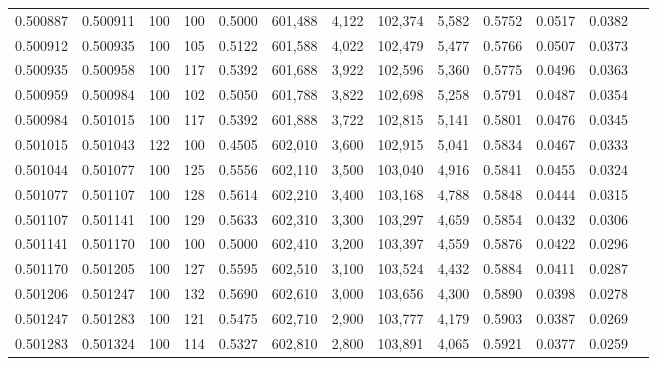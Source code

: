 \begin{tabular}{rrrrrrrrrrrrr}
0.500887 & 0.500911 &   100 & 100 &                                     0.5000 & 601,488 &   4,122 & 102,374 &   5,582 & 0.5752 & 0.0517 & 0.0382 \\
0.500912 & 0.500935 &   100 & 105 &                                     0.5122 & 601,588 &   4,022 & 102,479 &   5,477 & 0.5766 & 0.0507 & 0.0373 \\
0.500935 & 0.500958 &   100 & 117 &                                     0.5392 & 601,688 &   3,922 & 102,596 &   5,360 & 0.5775 & 0.0496 & 0.0363 \\
0.500959 & 0.500984 &   100 & 102 &                                     0.5050 & 601,788 &   3,822 & 102,698 &   5,258 & 0.5791 & 0.0487 & 0.0354 \\
0.500984 & 0.501015 &   100 & 117 &                                     0.5392 & 601,888 &   3,722 & 102,815 &   5,141 & 0.5801 & 0.0476 & 0.0345 \\
0.501015 & 0.501043 &   122 & 100 &                                     0.4505 & 602,010 &   3,600 & 102,915 &   5,041 & 0.5834 & 0.0467 & 0.0333 \\
0.501044 & 0.501077 &   100 & 125 &                                     0.5556 & 602,110 &   3,500 & 103,040 &   4,916 & 0.5841 & 0.0455 & 0.0324 \\
0.501077 & 0.501107 &   100 & 128 &                                     0.5614 & 602,210 &   3,400 & 103,168 &   4,788 & 0.5848 & 0.0444 & 0.0315 \\
0.501107 & 0.501141 &   100 & 129 &                                     0.5633 & 602,310 &   3,300 & 103,297 &   4,659 & 0.5854 & 0.0432 & 0.0306 \\
0.501141 & 0.501170 &   100 & 100 &                                     0.5000 & 602,410 &   3,200 & 103,397 &   4,559 & 0.5876 & 0.0422 & 0.0296 \\
0.501170 & 0.501205 &   100 & 127 &                                     0.5595 & 602,510 &   3,100 & 103,524 &   4,432 & 0.5884 & 0.0411 & 0.0287 \\
0.501206 & 0.501247 &   100 & 132 &                                     0.5690 & 602,610 &   3,000 & 103,656 &   4,300 & 0.5890 & 0.0398 & 0.0278 \\
0.501247 & 0.501283 &   100 & 121 &                                     0.5475 & 602,710 &   2,900 & 103,777 &   4,179 & 0.5903 & 0.0387 & 0.0269 \\
0.501283 & 0.501324 &   100 & 114 &                                     0.5327 & 602,810 &   2,800 & 103,891 &   4,065 & 0.5921 & 0.0377 & 0.0259 \\

\end{tabular}
